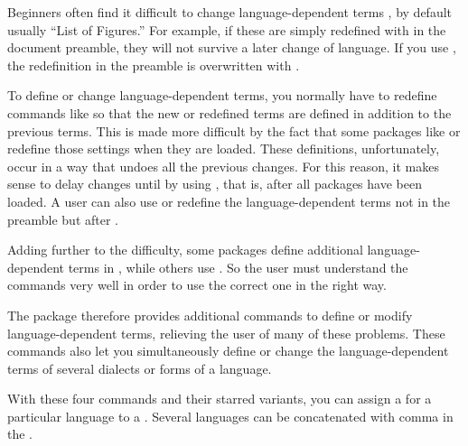 Beginners often find it difficult to change language-dependent terms
, by default usually ``List of
Figures.'' For example, if these are simply redefined with
 in the document preamble, they will not survive a later
change of language. If you use , the
redefinition in the preamble is overwritten with
.

To define or change language-dependent terms, you normally have to redefine
commands like  so that the new or redefined terms are
defined in addition to the previous terms. This is made more difficult by the
fact that some packages like  or
 redefine those settings when they are
loaded. These definitions, unfortunately, occur in a way that undoes all the
previous changes. For this reason, it makes sense to delay changes until
 by using , that is,
after all packages have been loaded. A user can also use
 or redefine the language-dependent terms not in the
preamble but after .

Adding further to the difficulty, some packages define additional
language-dependent terms in , while others use
. So the user must understand the commands very
well in order to use the correct one in the right way.

The  package therefore provides additional commands to define
or modify language-dependent terms, relieving the user of many of these
problems. These commands also let you simultaneously define or change the
language-dependent terms of several dialects or forms of a language.

\begin{Declaration}
\end{Declaration}
With these four commands and their starred variants, you can assign a
 for a particular language to a . Several
languages can be concatenated with comma in the .

